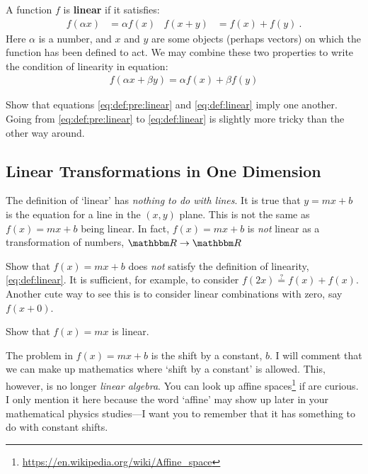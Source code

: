 \documentclass[12pt]{article}
\begin{document}
A function $f$ is \textbf{linear} if it satisfies:
\begin{align}
  f(\alpha x) &= \alpha f(x)
  &
  f(x+y) &= f(x) + f(y) \ .
  \label{eq:def:pre:linear}
\end{align}
Here $\alpha$ is a number, and $x$ and $y$ are some objects (perhaps vectors) on which the function has been defined to act. We may combine these two properties to write the condition of linearity in equation:
\begin{align}
  f(\alpha x + \beta y) = \alpha f(x)+\beta f(y)
  \label{eq:def:linear}
\end{align}
\begin{exercise}
Show that equations \eqref{eq:def:pre:linear} and \eqref{eq:def:linear} imply one another. Going from \eqref{eq:def:pre:linear} to \eqref{eq:def:linear} is slightly more tricky than the other way around.
\end{exercise}


\subsection{Linear Transformations in One Dimension}

The definition of `linear' has \emph{nothing to do with lines}. It is true that $y=mx+b$ is the equation for a line in the $(x,y)$ plane. This is not the same as $f(x)=mx+b$ being linear. In fact, $f(x)=mx+b$ is \emph{not} linear as a transformation of numbers, $\RR \to\RR $
\begin{exercise}
Show that $f(x) = mx+b$ does \emph{not} satisfy the definition of linearity, \eqref{eq:def:linear}. It is sufficient, for example, to consider $f(2x) \stackrel{?}{=}f(x)+f(x)$. Another cute way to see this is to consider linear combinations with zero, say $f(x+0)$.
\end{exercise}

\begin{exercise}
Show that $f(x) = mx$ is linear.
\end{exercise}

The problem in $f(x)=mx+b$ is the shift by a constant, $b$. I will comment that we can make up mathematics where `shift by a constant' is allowed. This, however, is no longer \emph{linear algebra}. You can look up affine spaces\footnote{\url{https://en.wikipedia.org/wiki/Affine_space}} if are curious. I only mention it here because the word `affine' may show up later in your mathematical physics studies---I want you to remember that it has something to do with constant shifts. 
\end{document}
